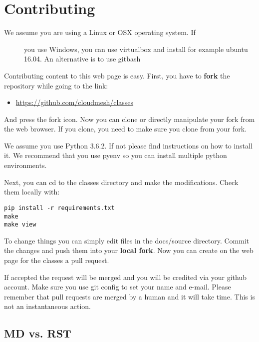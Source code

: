 \FILENAME

\section{Contributing}\label{contributing}

\begin{description}
\item[We assume you are using a Linux or OSX operating system. If]
you use Windows, you can use virtualbox and install for example ubuntu
16.04. An alternative is to use gitbash
\end{description}

Contributing content to this web page is easy. First, you have to
\textbf{fork} the repository while going to the link:

\begin{itemize}
\tightlist
\item
  \url{https://github.com/cloudmesh/classes}
\end{itemize}

And press the fork icon. Now you can clone or directly manipulate your
fork from the web browser. If you clone, you need to make sure you clone
from your fork.

We assume you use Python 3.6.2. If not please find instructions on how
to install it. We recommend that you use pyenv so you can install
multiple python environments.

Next, you can cd to the classes directory and make the modifications.
Check them locally with:

\begin{verbatim}
pip install -r requirements.txt
make
make view
\end{verbatim}

To change things you can simply edit files in the docs/source directory.
Commit the changes and push them into your \textbf{local fork}. Now you
can create on the web page for the classes a pull request.

If accepted the request will be merged and you will be credited via your
github account. Make sure you use git config to set your name and
e-mail. Please remember that pull requests are merged by a human and it
will take time. This is not an instantaneous action.

\subsection{MD vs. RST}\label{md-vs.-rst}

